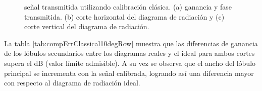 \begin{figure}[H]
	\centering

	\caption{señal transmitida utilizando calibración clásica. (a) ganancia y fase transmitida. (b) corte horizontal del 
	diagrama de radiación y (c) corte vertical del diagrama de radiación.}
	\label{fig:compErrClassical10degRow}
\end{figure}

La tabla \ref{tab:compErrClassical10degRow} muestra que las diferencias de ganancia de los lóbulos secundarios entre los diagramas 
reales y el ideal para ambos cortes supera el dB (valor límite admisible). A su vez se observa que el ancho del lóbulo 
principal se incrementa con la señal calibrada, logrando así una diferencia mayor con respecto al diagrama de radiación ideal.

